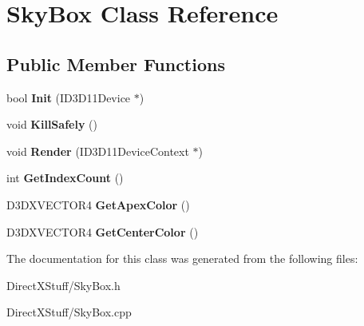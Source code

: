 \hypertarget{class_sky_box}{\section{Sky\-Box Class Reference}
\label{class_sky_box}
}
\subsection*{Public Member Functions}
\begin{DoxyCompactItemize}
\item 
\hypertarget{class_sky_box_a994de0851f0ed455a7a07ae7ec110a14}{bool {\bfseries Init} (I\-D3\-D11\-Device $\ast$)}\label{class_sky_box_a994de0851f0ed455a7a07ae7ec110a14}

\item 
\hypertarget{class_sky_box_a28ee70bae93eb423a7d531f6cf1cbbbf}{void {\bfseries Kill\-Safely} ()}\label{class_sky_box_a28ee70bae93eb423a7d531f6cf1cbbbf}

\item 
\hypertarget{class_sky_box_ac8b2f9f83a8d1b1e37d46dcaed2d523e}{void {\bfseries Render} (I\-D3\-D11\-Device\-Context $\ast$)}\label{class_sky_box_ac8b2f9f83a8d1b1e37d46dcaed2d523e}

\item 
\hypertarget{class_sky_box_a242cfcc38a6114ef9f90df93d17c8314}{int {\bfseries Get\-Index\-Count} ()}\label{class_sky_box_a242cfcc38a6114ef9f90df93d17c8314}

\item 
\hypertarget{class_sky_box_abe1c26924ddf86d3b1336fcfbb10b6e5}{D3\-D\-X\-V\-E\-C\-T\-O\-R4 {\bfseries Get\-Apex\-Color} ()}\label{class_sky_box_abe1c26924ddf86d3b1336fcfbb10b6e5}

\item 
\hypertarget{class_sky_box_a494352d819c435e3e3bb3d64585b0ccb}{D3\-D\-X\-V\-E\-C\-T\-O\-R4 {\bfseries Get\-Center\-Color} ()}\label{class_sky_box_a494352d819c435e3e3bb3d64585b0ccb}

\end{DoxyCompactItemize}


The documentation for this class was generated from the following files\-:\begin{DoxyCompactItemize}
\item 
Direct\-X\-Stuff/Sky\-Box.\-h\item 
Direct\-X\-Stuff/Sky\-Box.\-cpp\end{DoxyCompactItemize}
